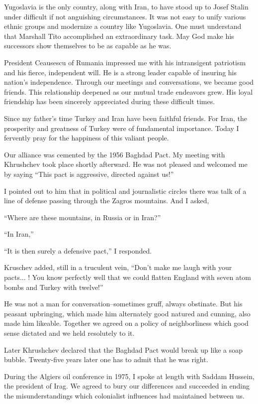 Yugoslavia is the only country, along with Iran, to have stood up to Josef Stalin under difficult if not anguishing circumstances. It was not easy to unify various ethnic groups and modernize a country like Yugoslavia. One must understand that Marshall Tito accomplished an extraordinary task. May God make his successors show themselves to be as capable as he was. 

President Ceausescu of Rumania impressed me with his intransigent patriotism and his fierce, independent will. He is a strong leader capable of insuring his nation’s independence. Through our meetings and conversations, we became good friends. This relationship deepened as our mutual trade endeavors grew. His loyal friendship has been sincerely appreciated during these difficult times. 


Since my father's time Turkey and Iran have been faithful friends. For Iran, the prosperity and greatness of Turkey were of fundamental importance. Today I fervently pray for the happiness of this valiant people. 

Our alliance was cemented by the 1956 Baghdad Pact. My meeting with Khrushchev took place shortly afterward. He was not pleased and welcomed me by saying “This pact is aggressive, directed against us!” 

I pointed out to him that in political and journalistic circles there was talk of a line of defense passing through the Zagros mountains. And I asked, 

“Where are these mountains, in Russia or in Iran?” 

“In Iran,” 

“It is then surely a defensive pact,” I responded. 

Kruschev added, still in a truculent vein, “Don't make me laugh with your pacts... ! You know perfectly well that we could flatten England with seven atom bombs and Turkey with twelve!” 

He was not a man for conversation--sometimes gruff, always obstinate. But his peasant upbringing, which made him alternately good natured and cunning, also made him likeable. Together we agreed on a policy of neighborliness which good sense dictated and we held resolutely to it. 

Later Khrushchev declared that the Baghdad Pact would break up like a soap bubble. Twenty-five years later one has to admit that he was right. 


During the Algiers oil conference in 1975, I spoke at length with Saddam Hussein, the president of Irag. We agreed to bury our differences and succeeded in ending the misunderstandings which colonialist influences had maintained between us. 

